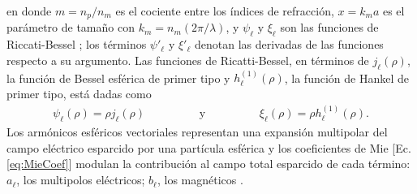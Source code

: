 \documentclass[letterpaper,11pt] {article}
\begin{document}
\hspace*{-.5em}en donde $m = n_p/n_m$ es el cociente entre los índices de refracción, $x = k_m a$ es el parámetro de tamaño con $k_m = n_m(2\pi/\lambda)$, y $\psi_\ell$ y $\xi_\ell$  son las funciones de Riccati-Bessel \cite{bohren1998absorption}; los términos $\psi'_\ell$ y $\xi'_\ell$ denotan las derivadas de las funciones respecto a su argumento.  Las funciones de Ricatti-Bessel, en términos de  $j_\ell(\rho)$, la función de Bessel esférica de primer tipo y $h_\ell^{(1)}(\rho)$, la función de Hankel de primer tipo,  está dadas como \cite{bohren1998absorption,arfken2001methods}
	\begin{align*}
	\psi_\ell (\rho) = \rho j_\ell (\rho)
	\hspace{2cm}\mbox{y}\hspace{2cm}
	\xi_\ell (\rho) = \rho h_\ell ^{(1)}(\rho). 
	\end{align*}
Los armónicos esféricos vectoriales representan una expansión multipolar del campo eléctrico esparcido por una partícula esférica y los coeficientes de Mie [Ec.  \eqref{eq:MieCoef}] modulan la contribución al campo total esparcido de cada término:  $a_\ell$, los multipolos eléctricos; $b_\ell$, los magnéticos \cite{kreibig1995clusters}. 
\end{document}
